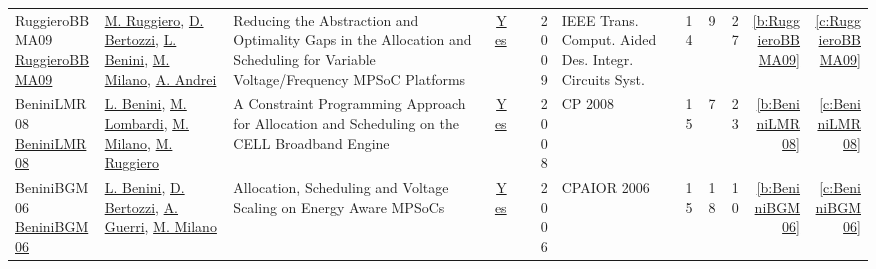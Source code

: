 {\begin{longtable}{>{\raggedright\arraybackslash}p{3cm}>{\raggedright\arraybackslash}p{6cm}>{\raggedright\arraybackslash}p{6.5cm}rrrp{2.5cm}rrrrr}
RuggieroBBMA09 \href{https://doi.org/10.1109/TCAD.2009.2013536}{RuggieroBBMA09} & \hyperref[auth:a727]{M. Ruggiero}, \hyperref[auth:a381]{D. Bertozzi}, \hyperref[auth:a248]{L. Benini}, \hyperref[auth:a144]{M. Milano}, \hyperref[auth:a728]{A. Andrei} & Reducing the Abstraction and Optimality Gaps in the Allocation and Scheduling for Variable Voltage/Frequency MPSoC Platforms & \href{../works/RuggieroBBMA09.pdf}{Yes} & \cite{RuggieroBBMA09} & 2009 & {IEEE} Trans. Comput. Aided Des. Integr. Circuits Syst. & 14 & 9 & 27 & \ref{b:RuggieroBBMA09} & \ref{c:RuggieroBBMA09}\\
BeniniLMR08 \href{http://dx.doi.org/10.1007/978-3-540-85958-1_2}{BeniniLMR08} & \hyperref[auth:a248]{L. Benini}, \hyperref[auth:a143]{M. Lombardi}, \hyperref[auth:a144]{M. Milano}, \hyperref[auth:a727]{M. Ruggiero} & A Constraint Programming Approach for Allocation and Scheduling on the CELL Broadband Engine & \href{../works/BeniniLMR08.pdf}{Yes} & \cite{BeniniLMR08} & 2008 & CP 2008 & 15 & 7 & 23 & \ref{b:BeniniLMR08} & \ref{c:BeniniLMR08}\\
BeniniBGM06 \href{https://doi.org/10.1007/11757375\_6}{BeniniBGM06} & \hyperref[auth:a248]{L. Benini}, \hyperref[auth:a381]{D. Bertozzi}, \hyperref[auth:a382]{A. Guerri}, \hyperref[auth:a144]{M. Milano} & Allocation, Scheduling and Voltage Scaling on Energy Aware MPSoCs & \href{../works/BeniniBGM06.pdf}{Yes} & \cite{BeniniBGM06} & 2006 & CPAIOR 2006 & 15 & 18 & 10 & \ref{b:BeniniBGM06} & \ref{c:BeniniBGM06}\\
\end{longtable}
}

\clearpage
